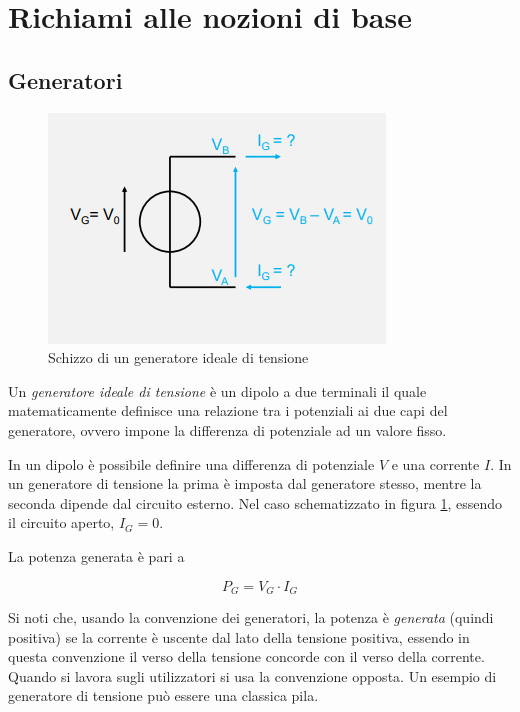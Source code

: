 \documentclass{article}
\begin{document}
\section{Richiami alle nozioni di base}

\subsection{Generatori}

\begin{figure}[h]
  \centering
  \includegraphics[scale=0.6]{IM_generatori_tensione}
  \caption{Schizzo di un generatore ideale di tensione}
  \label{Schema_generatori_tensione}
\end{figure}

Un \textit{generatore ideale di tensione} è un dipolo a due terminali il quale matematicamente definisce una relazione tra i potenziali ai due capi del generatore, ovvero impone la differenza di potenziale ad un valore fisso. 

\vspace{1mm}

In un dipolo è possibile definire una differenza di potenziale $V$ e una corrente $I$. In un generatore di tensione la prima è imposta dal generatore stesso, mentre la seconda dipende dal circuito esterno. Nel caso schematizzato in figura \ref{Schema_generatori_tensione}, essendo il circuito aperto, $I_G = 0$.

\vspace{1mm}

La potenza generata è pari a 

\[P_G = V_G \cdot I_G\]

Si noti che, usando la convenzione dei generatori, la potenza è \textit{generata} (quindi positiva) se la corrente è uscente dal lato della tensione positiva, essendo in questa convenzione il verso della tensione concorde con il verso della corrente. Quando si lavora sugli utilizzatori si usa la convenzione opposta. Un esempio di generatore di tensione può essere una classica pila.
\end{document}
